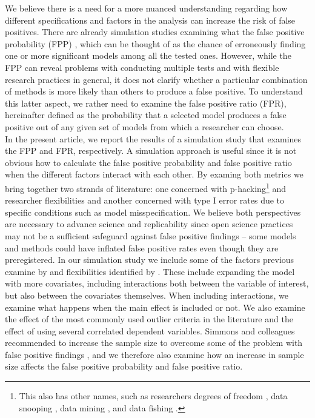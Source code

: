 
We believe there is a need for a more nuanced understanding regarding how different specifications and factors in the analysis can increase the risk of false positives. There are already simulation studies examining what the false positive probability (FPP) \citep{Simmons2011}, which can be thought of as the chance of erroneously finding one or more significant models among all the tested ones. However, while the FPP can reveal problems with conducting multiple tests and with flexible research practices in general, it does not clarify whether a particular combination of methods is more likely than others to produce a false positive. To understand this latter aspect, we rather need to examine the false positive ratio (FPR), hereinafter defined as the probability that a selected model produces a false positive out of any given set of models from which a researcher can choose. \\

In the present article, we report the results of a simulation study that examines the FPP and FPR, respectively. A simulation approach is useful since it is not obvious how to calculate the false positive probability and false positive ratio when the different factors interact with each other. By examing both metrics we bring together two strands of literature: one concerned with p-hacking\footnote{This also has other names, such as researchers degrees of freedom \citep{Simmons2011}, data snooping \citep{white2000reality}, data mining \citep{lovell1983}, and data fishing \citep{selvin1966data} .} \citep{simonsohn2014p} and researcher flexibilities and another concerned with type I error rates due to specific conditions such as model misspecification. We believe both perspectives are necessary to advance science and replicability since open science practices may not be a sufficient safeguard against false positive findings – some models and methods could have inflated false positive rates even though they are preregistered. In our simulation study we include some of the factors previous examine by \cite{Simmons2011} and flexibilities identified by \cite{Wicherts2016}. These include expanding the model with more covariates, including interactions both between the variable of interest, but also between the covariates themselves. When including interactions, we examine what happens when the main effect is included or not. We also examine the effect of the most commonly used outlier criteria in the literature \citep{Leyes2013} and the effect of using several correlated dependent variables. Simmons and colleagues recommended to increase the sample size to overcome some of the problem with false positive findings \citep{Simmons2011}, and we therefore also examine how an increase in sample size affects the false positive probability and false positive ratio. 
